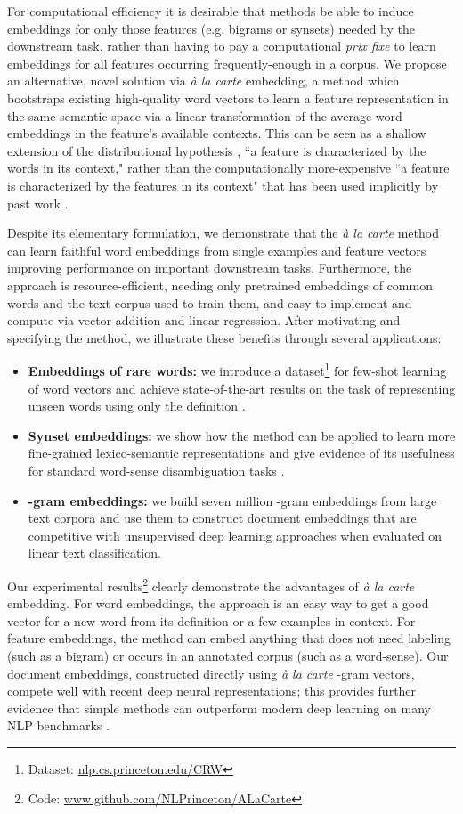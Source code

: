\documentclass[11pt,a4paper]{article}
\begin{document}
For computational efficiency it is desirable that methods be able to induce embeddings for only those features (e.g. bigrams or synsets) needed by the downstream task, rather than having to pay a computational {\em prix fixe} to learn embeddings for all features occurring frequently-enough in a corpus. 
We propose an alternative, novel solution via {\em\`a la carte} embedding, a method which bootstraps existing high-quality word vectors to learn a feature representation in the same semantic space via a linear transformation of the average word embeddings in the feature's available contexts.
This can be seen as a shallow extension of the distributional hypothesis \cite{Harris:54}, ``a feature is characterized by the words in its context," rather than the computationally more-expensive ``a feature is characterized by the features in its context" that has been used implicitly by past work \cite{Rothe:15,Logeswaran:18}. 

Despite its elementary formulation, we demonstrate that the {\em\`a la carte} method can learn faithful word embeddings from single examples and feature vectors improving performance on important downstream tasks.
Furthermore, the approach is resource-efficient, needing only pretrained embeddings of common words and the text corpus used to train them, and easy to implement and compute via vector addition and linear regression.
After motivating and specifying the method, we illustrate these benefits through several applications:
\begin{itemize}
	\item {\bf Embeddings of rare words:} we introduce a dataset\footnote{Dataset: \url{nlp.cs.princeton.edu/CRW}} for few-shot learning of word vectors and achieve state-of-the-art results on the task of representing unseen words using only the definition \cite{Herbelot:17}.
	\item {\bf Synset embeddings:} we show how the method can be applied to learn more fine-grained lexico-semantic representations and give evidence of its usefulness for standard word-sense disambiguation tasks \cite{Navigli:13,Moro:15}.
	\item {\bf -gram embeddings:} we build seven million -gram embeddings from large text corpora and use them to construct document embeddings that are competitive with unsupervised deep learning approaches when evaluated on linear text classification.
\end{itemize}
Our experimental results\footnote{Code: \url{www.github.com/NLPrinceton/ALaCarte}} clearly demonstrate the advantages of {\em\` a la carte} embedding.
For word embeddings, the approach is an easy way to get a good vector for a new word from its definition or a few examples in context.
For feature embeddings, the method can embed anything that does not need labeling (such as a bigram) or occurs in an annotated corpus (such as a word-sense).
Our document embeddings, constructed directly using {\em\` a la carte} -gram vectors, compete well with recent deep neural representations; this provides further evidence that simple methods can outperform modern deep learning on many NLP benchmarks \cite{Arora:17,Mu:18,Arora:18a,Arora:18b,Pagliardini:18}. 
\end{document}
